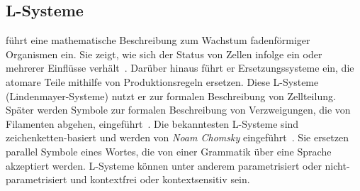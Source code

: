 \subsection*{L-Systeme}
\citeauthor{lindemayer_1968} führt eine mathematische Beschreibung zum Wachstum fadenförmiger Organismen ein.
Sie zeigt, wie sich der Status von Zellen infolge ein oder mehrerer Einflüsse verhält~\cite{lindemayer_1968}.
Darüber hinaus führt er Ersetzungssysteme ein, die atomare Teile mithilfe von Produktionsregeln ersetzen.
Diese L-Systeme (Lindenmayer-Systeme) nutzt er zur formalen Beschreibung von Zellteilung.
Später werden Symbole zur formalen Beschreibung von Verzweigungen, die von Filamenten abgehen, eingeführt~\cite{prusinkiewicz_1990}.
Die bekanntesten L-Systeme sind zeichenketten-basiert und werden von \textit{Noam Chomsky} eingeführt~\cite{chomsky_1956}.
Sie ersetzen parallel Symbole eines Wortes, die von einer Grammatik über eine Sprache akzeptiert werden.
L-Systeme können unter anderem parametrisiert oder nicht-parametrisiert und kontextfrei oder kontextsensitiv sein.

